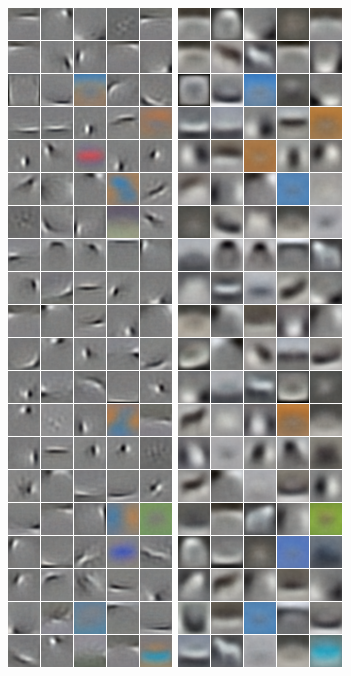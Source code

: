 \documentclass[paperwidth=38in,paperheight=28in,landscape,fontscale=0.4]{baposter}
\begin{document}
\begin{poster}
{\begin{center}
\includegraphics[scale=0.366]{CIFAR_shrink01.png}	
\includegraphics[scale=0.366]{CIFAR_shrink05.png}	
\end{center} 
}


\end{poster}
\end{document}
